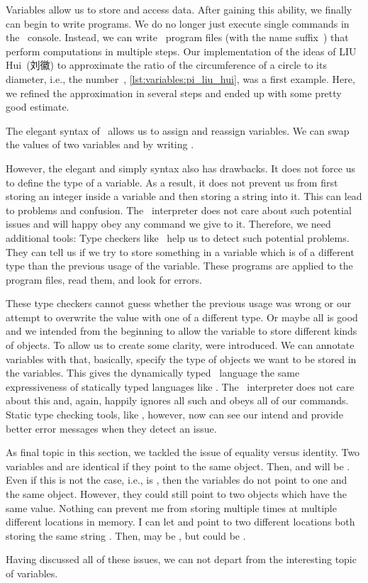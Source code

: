 %
%
Variables allow us to store and access data.
After gaining this ability, we finally can begin to write  programs.
We do no longer just execute single commands in the \python\ console.
Instead, we can write \python\ program files (with the name suffix~) that perform computations in multiple steps.
Our implementation of the ideas of LIU Hui~(刘徽) to approximate the ratio of the circumference of a circle to its diameter, i.e., the number~\numberPi, \cref{lst:variables:pi_liu_hui}, was a first example.
Here, we refined the approximation in several steps and ended up with some pretty good estimate.

The elegant syntax of \python\ allows us to assign and reassign variables.
We can swap the values of two variables  and  by writing .

However, the elegant and simply syntax also has drawbacks.
It does not force us to define the type of a variable.
As a result, it does not prevent us from first storing an integer inside a variable and then storing a string into it.
This can lead to problems and confusion.
The \python\ interpreter does not care about such potential issues and will happy obey any command we give to it.
Therefore, we need additional tools:
Type checkers like \mypy\ help us to detect such potential problems.
They can tell us if we try to store something in a variable which is of a different type than the previous usage of the variable.
These programs are applied to the program files, read them, and look for errors.

These type checkers cannot guess whether the previous usage was wrong or our attempt to overwrite the value with one of a different type.
Or maybe all is good and we intended from the beginning to allow the variable to store different kinds of objects.
To allow us to create some clarity,  were introduced.
We can annotate variables with  that, basically, specify the type of objects we want to be stored in the variables.
This gives the dynamically typed \python\ language the same expressiveness of statically typed languages like .
The \python\ interpreter does not care about this and, again, happily ignores all such  and obeys all of our commands.
Static type checking tools, like \mypy, however, now can see our intend and provide better error messages when they detect an issue.

As final topic in this section, we tackled the issue of equality versus identity.
Two variables  and  are identical if they point to the same object.
Then,  and  will be .
Even if this is not the case, i.e.,  is , then the variables do not point to one and the same object.
However, they could still point to two objects which have the same value.
Nothing can prevent me from storing  multiple times at multiple different locations in memory.
I can let  and  point to two different locations both storing the same string .
Then,  may be , but  could be .

Having discussed all of these issues, we can not depart from the interesting topic of variables.%
%
\endhsection%
%
